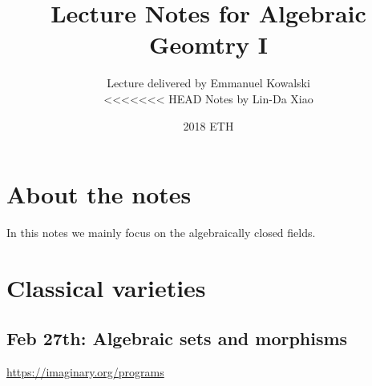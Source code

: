 \documentclass[11pt]{article}
\title{\bf Lecture Notes for Algebraic Geomtry I}
\author{Lecture delivered by Emmanuel Kowalski\\
<<<<<<< HEAD
Notes by Lin-Da Xiao}
\date{2018 ETH}
\begin{document}
\maketitle
\tableofcontents
\section*{About the notes}
In this notes we mainly focus on the algebraically closed fields.
\newpage
\section{Classical varieties}
\subsection{Feb 27th: Algebraic sets and morphisms}
\href{https://imaginary.org/programs}{https://imaginary.org/programs}
\end{document}
